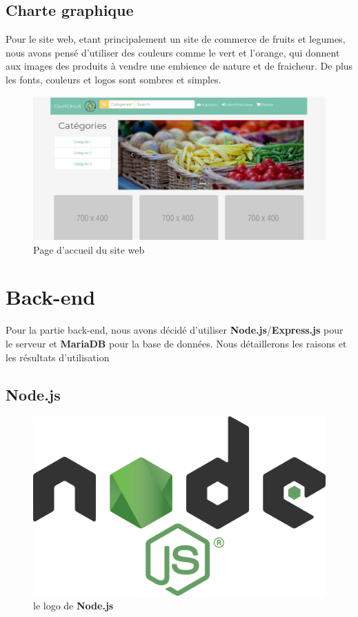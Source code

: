 \documentclass[a4paper,12pt]{report}
\theoremstyle{break}
\theoremstyle{break}
\theoremstyle{break}
\theoremstyle{break}
\theoremstyle{definition}
\theoremstyle{remark}
\begin{document}
\subsection{Charte graphique}
Pour le site web, etant principalement un site de commerce de fruits et legumes, nous avons pensé d'utiliser des couleurs comme le vert et
l'orange, qui donnent aux images des produits à vendre une embience de nature et de fraicheur. De plus les fonts, couleurs et logos sont sombres et simples.
\newpage
\begin{figure}[!ht]
  \centering
  \includegraphics[scale=0.3]{images/accueil.png}
  \caption{Page d'accueil du site web}
\end{figure}
\section{Back-end}
Pour la partie back-end, nous avons décidé d'utiliser \textbf{Node.js}/\textbf{Express.js} pour le serveur et \textbf{MariaDB} pour la base de données. Nous détaillerons les raisons et les résultats d'utilisation
\subsection{Node.js}
\begin{figure}[!ht]
  \centering
  \includegraphics[scale=0.05]{images/nodejs_icon.png}
  \caption{le logo de \textbf{Node.js}}
\end{figure}
\end{document}
